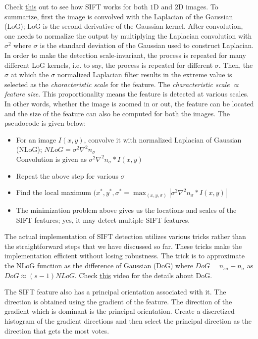 \documentclass{report}
\begin{document}
Check \href{https://www.youtube.com/watch?v=zItstOggP7M&list=PL2zRqk16wsdqXEMpHrc4Qnb5rA1Cylrhx&index=14}{this} out to see how SIFT works for both $1$D and $2$D images. To summarize, first the image is convolved with the Laplacian of the Gaussian (LoG); LoG is the second derivative of the Gaussian kernel. After convolution, one needs to normalize the output by multiplying the Laplacian convolution with $\sigma^2$ where $\sigma$ is the standard deviation of the Gaussian used to construct Laplacian. In order to make the detection scale-invariant, the process is repeated for many different LoG kernels, i.e. to say, the process is repeated for different $\sigma$. Then, the $\sigma$ at which the $\sigma$ normalized Laplacian filter results in the extreme value is selected as the \textit{characteristic scale} for the feature. The \textit{characteristic scale} $\propto$ \textit{feature size}. This proportionality means the feature is detected at various scales. In other words, whether the image is zoomed in or out, the feature can be located and the size of the feature can also be computed for both the images. The pseudocode is given below:
\begin{itemize}
	\item For an image $I(x,y)$, convolve it with normalized Laplacian of Gaussian (NLoG); $NLoG = \sigma^2 \nabla^2 n_\sigma$ \\
		Convolution is given as $\sigma^2 \nabla^2 n_\sigma * I(x,y)$
	\item Repeat the above step for various $\sigma$
	\item Find the local maximum
		$(x^*, y^*, \sigma^* = \max_{(x, y, \sigma)} |\sigma^2 \nabla^2 n_\sigma * I(x,y)|$
	\item The minimization problem above gives us the locations and scales of the SIFT features; yes, it may detect multiple SIFT features.
\end{itemize}

The actual implementation of SIFT detection utilizes various tricks rather than the straightforward steps that we have discussed so far. These tricks make the implementation efficient without losing robustness. The trick is to approximate the NLoG function as the difference of Gaussian (DoG) where $DoG = n_{s\sigma} - n_\sigma$ as $DoG \approx (s - 1) NLoG$. Check \href{https://www.youtube.com/watch?v=ram-jbLJjFg&list=PL2zRqk16wsdqXEMpHrc4Qnb5rA1Cylrhx&index=15}{this} video for the details about DoG.

The SIFT feature also has a principal orientation associated with it. The direction is obtained using the gradient of the feature. The direction of the gradient which is dominant is the principal orientation. Create a discretized histogram of the gradient directions and then select the principal direction as the direction that gets the most votes.
\end{document}
